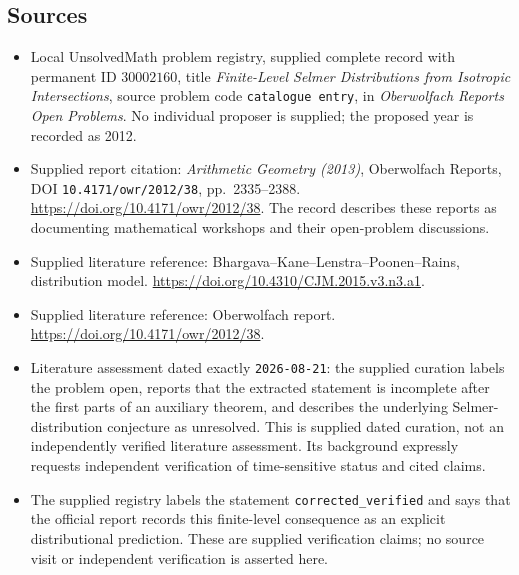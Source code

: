\documentclass[11pt]{article}
\begin{document}
\subsection{Sources}
\begin{itemize}
\item Local UnsolvedMath problem registry, supplied complete record with permanent ID \(30002160\), title \emph{Finite-Level Selmer Distributions from Isotropic Intersections}, source problem code \texttt{catalogue entry}, in \emph{Oberwolfach Reports Open Problems}. No individual proposer is supplied; the proposed year is recorded as 2012.
\item Supplied report citation: \emph{Arithmetic Geometry (2013)}, Oberwolfach Reports, DOI \texttt{10.4171/owr/2012/38}, pp.\ 2335--2388. \url{https://doi.org/10.4171/owr/2012/38}. The record describes these reports as documenting mathematical workshops and their open-problem discussions.
\item Supplied literature reference: Bhargava--Kane--Lenstra--Poonen--Rains, distribution model. \url{https://doi.org/10.4310/CJM.2015.v3.n3.a1}.
\item Supplied literature reference: Oberwolfach report. \url{https://doi.org/10.4171/owr/2012/38}.
\item Literature assessment dated exactly \texttt{2026-08-21}: the supplied curation labels the problem open, reports that the extracted statement is incomplete after the first parts of an auxiliary theorem, and describes the underlying Selmer-distribution conjecture as unresolved. This is supplied dated curation, not an independently verified literature assessment. Its background expressly requests independent verification of time-sensitive status and cited claims.
\item The supplied registry labels the statement \texttt{corrected\_verified} and says that the official report records this finite-level consequence as an explicit distributional prediction. These are supplied verification claims; no source visit or independent verification is asserted here.
\end{itemize}
\end{document}
